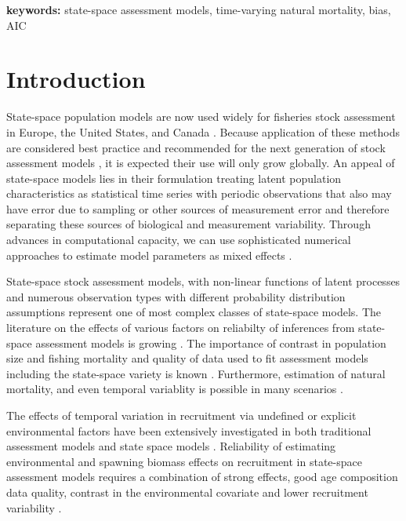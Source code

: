 \documentclass[
  12pt,
]{article}
\begin{document}
\textbf{keywords:} state-space assessment models, time-varying natural mortality, bias, AIC

\pagebreak

\hypertarget{introduction}{%
\section*{Introduction}\label{introduction}}

State-space population models are now used widely for fisheries stock assessment in Europe, the United States, and Canada \citep{nielsenberg14, cadigan16, pedersenberg17, stockmiller21}. Because application of these methods are considered best practice and recommended for the next generation of stock assessment models \citep{hoyleetal22, punt23}, it is expected their use will only grow globally. An appeal of state-space models lies in their formulation treating latent population characteristics as statistical time series with periodic observations that also may have error due to sampling or other sources of measurement error and therefore separating these sources of biological and measurement variability. Through advances in computational capacity, we can use sophisticated numerical approaches to estimate model parameters as mixed effects \citep{thorsonminto15, kristensenetal16}.

State-space stock assessment models, with non-linear functions of latent processes and numerous observation types with different probability distribution assumptions represent one of most complex classes of state-space models. The literature on the effects of various factors on reliabilty of inferences from state-space assessment models is growing \citep{lietal24, milleretal_inreview1}. The importance of contrast in population size and fishing mortality and quality of data used to fit assessment models including the state-space variety is known \citep{magnussonhilborn07, milleretal_inreview1}. Furthermore, estimation of natural mortality, and even temporal variablity is possible in many scenarios \citep{leeetal11, cadigan16, millerhyun18, milleretal_inreview1}.

The effects of temporal variation in recruitment via undefined or explicit environmental factors have been extensively investigated in both traditional assessment models and state space models \citep{myers98, haltuchpunt11, johnsonetal16, milleretal16}. Reliability of estimating environmental and spawning biomass effects on recruitment in state-space assessment models requires a combination of strong effects, good age composition data quality, contrast in the environmental covariate and lower recruitment variability \citep{brittenetal_inreview, milleretal_inreview1}.
\end{document}
